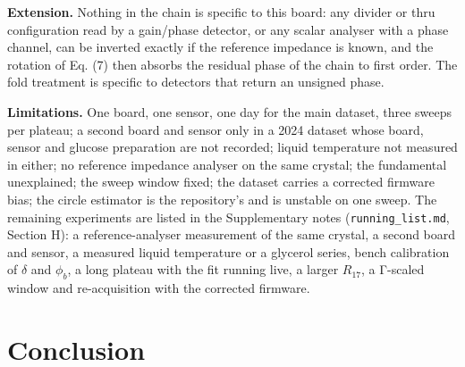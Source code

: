 \documentclass[11pt,a4paper]{article}
\begin{document}
\textbf{Extension.} Nothing in the chain is specific to this board: any
divider or thru configuration read by a gain/phase detector, or any
scalar analyser with a phase channel, can be inverted exactly if the
reference impedance is known, and the rotation of Eq. (7) then absorbs
the residual phase of the chain to first order. The fold treatment is
specific to detectors that return an unsigned phase.

\textbf{Limitations.} One board, one sensor, one day for the main
dataset, three sweeps per plateau; a second board and sensor only in a
2024 dataset whose board, sensor and glucose preparation are not
recorded; liquid temperature not measured in either; no reference
impedance analyser on the same crystal; the fundamental unexplained; the
sweep window fixed; the dataset carries a corrected firmware bias; the
circle estimator is the repository's and is unstable on one sweep. The
remaining experiments are listed in the Supplementary notes
(\texttt{running\_list.md}, Section H): a reference-analyser measurement
of the same crystal, a second board and sensor, a measured liquid
temperature or a glycerol series, bench calibration of \(\delta\) and
\(\phi_b\), a long plateau with the fit running live, a larger
\(R_{17}\), a Γ-scaled window and re-acquisition with the corrected
firmware.

\hypertarget{conclusion}{%
\section{Conclusion}\label{conclusion}}
\end{document}

